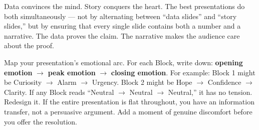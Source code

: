 \begin{lessonbox}
Data convinces the mind. Story conquers the heart. The best presentations do both simultaneously --- not by alternating between ``data slides'' and ``story slides,'' but by ensuring that every single slide contains both a number and a narrative. The data proves the claim. The narrative makes the audience care about the proof.
\end{lessonbox}

\begin{keybox}
Map your presentation's emotional arc. For each Block, write down: \textbf{opening emotion} $\to$ \textbf{peak emotion} $\to$ \textbf{closing emotion}. For example: Block 1 might be Curiosity $\to$ Alarm $\to$ Urgency. Block 2 might be Hope $\to$ Confidence $\to$ Clarity. If any Block reads ``Neutral $\to$ Neutral $\to$ Neutral,'' it has no tension. Redesign it. If the entire presentation is flat throughout, you have an information transfer, not a persuasive argument. Add a moment of genuine discomfort before you offer the resolution.
\end{keybox}
